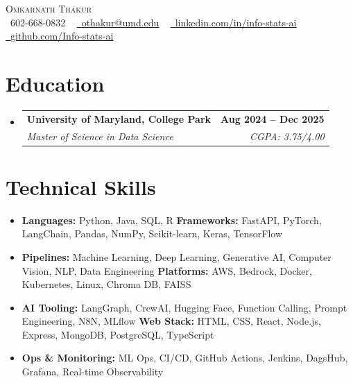 \documentclass[letterpaper,9pt]{article}
\makeatletter
\newcommand{\resumeSubheading}[4]{
  \item
    \begin{tabular*}{\textwidth}[t]{l@{\extracolsep{\fill}}r}
      \textbf{#1} & \textbf{\small #2} \\
      \textit{\small #3} & \textit{\small #4} \\
    \end{tabular*}\vspace{-4pt}
}
\newcommand{\resumeSubHeadingListStart}{\begin{itemize}[leftmargin=0.0in,label={},itemsep=4pt,topsep=2pt]}
\newcommand{\resumeSubHeadingListEnd}{\end{itemize}}
\makeatother
\begin{document}
\begin{center}
    {\Huge \scshape Omkarnath Thakur} \\ \vspace{2pt}
    \small \raisebox{-0.1\height}\faPhone\ 602-668-0832 ~ \href{mailto:othakur@umd.edu}{\raisebox{-0.2\height}\faEnvelope\ \underline{othakur@umd.edu}} ~
    \href{https://www.linkedin.com/in/info-stats-ai/}{\raisebox{-0.2\height}\faLinkedin\ \underline{linkedin.com/in/info-stats-ai}} ~
    \href{https://github.com/Info-stats-ai}{\raisebox{-0.2\height}\faGithub\ \underline{github.com/Info-stats-ai}}
\end{center}

\section{Education}
  \resumeSubHeadingListStart
    \resumeSubheading{University of Maryland, College Park}{Aug 2024 -- Dec 2025}{Master of Science in Data Science}{CGPA: 3.75/4.00}
  \resumeSubHeadingListEnd

\section{Technical Skills}
    \begin{itemize}[leftmargin=0.0in,label={},itemsep=1.5pt,topsep=2pt]
      \item \small{\textbf{Languages:} Python, Java, SQL, R \hfill \textbf{Frameworks:} FastAPI, PyTorch, LangChain, Pandas, NumPy, Scikit-learn, Keras, TensorFlow}
      \item \small{\textbf{Pipelines:} Machine Learning, Deep Learning, Generative AI, Computer Vision, NLP, Data Engineering \hfill \textbf{Platforms:} AWS, Bedrock, Docker, Kubernetes, Linux, Chroma DB, FAISS}
      \item \small{\textbf{AI Tooling:} LangGraph, CrewAI, Hugging Face, Function Calling, Prompt Engineering, N8N, MLflow \hfill \textbf{Web Stack:} HTML, CSS, React, Node.js, Express, MongoDB, PostgreSQL, TypeScript}
      \item \small{\textbf{Ops \& Monitoring:} ML Ops, CI/CD, GitHub Actions, Jenkins, DagsHub, Grafana, Real-time Observability}
    \end{itemize}

\end{document}
